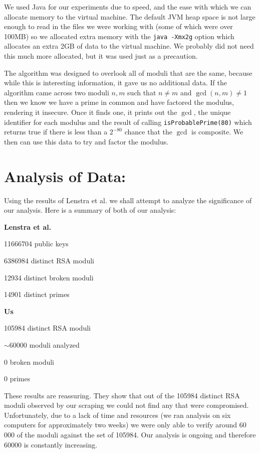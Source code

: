 \documentclass[11pt,twoside]{article}
\newcommand{\ty}[1]{\texttt{#1}}
\begin{document}
\begin{multicols}{2}
We used Java for our experiments due to speed, and the ease with which we can
allocate memory to the virtual machine. The default JVM heap space is not large
enough to read in the files we were working with (some of which were over 100MB)
so we allocated extra memory with the \ty{java -Xmx2g} option which allocates an
extra 2GB of data to the virtual machine. We probably did not need this much
more allocated, but it was used just as a precaution.

The algorithm was designed to overlook all of moduli that are the same, because
while this is interesting information, it gave us no additional data. If the
algorithm came across two moduli $n,m$ such that $n \neq m$ and $\gcd(n,m) \neq
1$ then we know we have a prime in common and have factored the modulus,
rendering it insecure. Once it finds one, it prints out the $\gcd$, the unique
identifier for each modulus and the result of calling \ty{isProbablePrime(80)}
which returns true if there is less than a $2^{-80}$ chance that the $\gcd$ is
composite. We then can use this data to try and factor the modulus.

\section{Analysis of Data:}
Using the results of Lenstra et al. we shall attempt to analyze the significance
of our analysis. Here is a summary of both of our analysis:

\textbf{Lenstra et al.}
\begin{compactitem}
\item 11666704 public keys
\item 6386984 distinct RSA moduli
\item 12934 distinct broken moduli
\item 14901 distinct primes
\end{compactitem}

\textbf{Us}
\begin{compactitem}
\item 105984 distinct RSA moduli
\item $\sim$60000 moduli analyzed
\item 0 broken moduli
\item 0 primes
\end{compactitem}

These results are reassuring. They show that out of the 105984 distinct RSA
moduli observed by our scraping we could not find any that were compromised.
Unfortunately, due to a lack of time and resources (we ran analysis on six
computers for approximately two weeks) we were only able to verify around 60 000
of the moduli against the set of 105984. Our analysis is ongoing and therefore
60000 is constantly increasing. 


\end{multicols}
\end{document}

